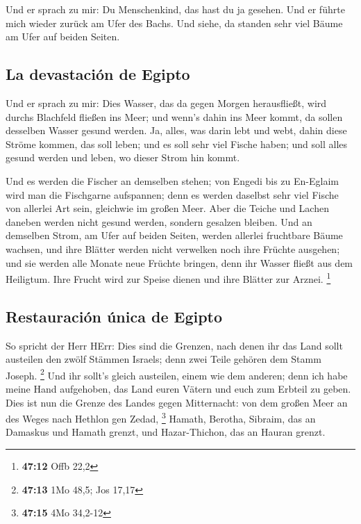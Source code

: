  Und er sprach zu mir: Du Menschenkind, das hast du ja
gesehen. Und er führte mich wieder zurück am Ufer des Bachs.
 Und siehe, da standen sehr viel Bäume am Ufer auf beiden
Seiten.

\hypertarget{la-devastaciuxf3n-de-egipto}{%
\subsection{La devastación de
Egipto}\label{la-devastaciuxf3n-de-egipto}}

 Und er sprach zu mir: Dies Wasser, das da gegen Morgen
herausfließt, wird durchs Blachfeld fließen ins Meer; und wenn's dahin
ins Meer kommt, da sollen desselben Wasser gesund werden. 
Ja, alles, was darin lebt und webt, dahin diese Ströme kommen, das soll
leben; und es soll sehr viel Fische haben; und soll alles gesund werden
und leben, wo dieser Strom hin kommt.

 Und es werden die Fischer an demselben stehen; von
Engedi bis zu En-Eglaim wird man die Fischgarne aufspannen; denn es
werden daselbst sehr viel Fische von allerlei Art sein, gleichwie im
großen Meer.  Aber die Teiche und Lachen daneben werden
nicht gesund werden, sondern gesalzen bleiben.  Und an
demselben Strom, am Ufer auf beiden Seiten, werden allerlei fruchtbare
Bäume wachsen, und ihre Blätter werden nicht verwelken noch ihre Früchte
ausgehen; und sie werden alle Monate neue Früchte bringen, denn ihr
Wasser fließt aus dem Heiligtum. Ihre Frucht wird zur Speise dienen und
ihre Blätter zur Arznei. \footnote{\textbf{47:12} Offb 22,2}

\hypertarget{restauraciuxf3n-uxfanica-de-egipto}{%
\subsection{Restauración única de
Egipto}\label{restauraciuxf3n-uxfanica-de-egipto}}

 So spricht der Herr HErr: Dies sind die Grenzen, nach
denen ihr das Land sollt austeilen den zwölf Stämmen Israels; denn zwei
Teile gehören dem Stamm Joseph. \footnote{\textbf{47:13} 1Mo 48,5; Jos
  17,17}  Und ihr sollt's gleich austeilen, einem wie dem
anderen; denn ich habe meine Hand aufgehoben, das Land euren Vätern und
euch zum Erbteil zu geben.  Dies ist nun die Grenze des
Landes gegen Mitternacht: von dem großen Meer an des Weges nach Hethlon
gen Zedad, \footnote{\textbf{47:15} 4Mo 34,2-12}  Hamath,
Berotha, Sibraim, das an Damaskus und Hamath grenzt, und Hazar-Thichon,
das an Hauran grenzt.

